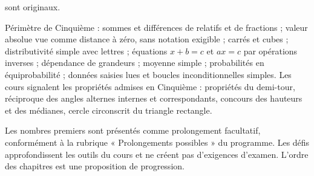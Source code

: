 sont originaux.\par\medskip
Périmètre de Cinquième : sommes et différences de relatifs et de fractions ;
valeur absolue vue comme distance à zéro, sans notation exigible ;
carrés et cubes ; distributivité simple avec lettres ; équations $x+b=c$
et $ax=c$ par opérations inverses ; dépendance de grandeurs ; moyenne
simple ; probabilités en équiprobabilité ; données saisies lues et boucles
inconditionnelles simples. Les cours signalent les propriétés admises
en Cinquième : propriétés du demi-tour, réciproque des angles alternes
internes et correspondants, concours des hauteurs et des médianes, cercle
circonscrit du triangle rectangle.\par\medskip
Les nombres premiers sont présentés comme prolongement facultatif,
conformément à la rubrique « Prolongements possibles » du programme. Les défis
approfondissent les outils du cours et ne créent pas d’exigences d’examen.
L’ordre des chapitres est une proposition de progression.

\clearpage
